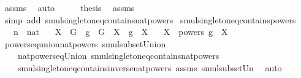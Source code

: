 \begin{isabellebody}
\ assms\ \isamarkupfalse%
\ auto\isanewline
\ \ \isamarkupfalse%
\ \isamarkupfalse%
\ {\isacharquery}{\kern0pt}thesis\ \isamarkupfalse%
\ assms\ \isamarkupfalse%
\ {\isacharparenleft}{\kern0pt}simp\ add{\isacharcolon}{\kern0pt}\ smul{\isacharunderscore}{\kern0pt}singleton{\isacharunderscore}{\kern0pt}eq{\isacharunderscore}{\kern0pt}contains{\isacharunderscore}{\kern0pt}nat{\isacharunderscore}{\kern0pt}powers{\isacharparenright}{\kern0pt}\isanewline
{}\isamarkupfalse%
%
\endisatagproof
{\isafoldproof}%
%
\isadelimproof
\isanewline
%
\endisadelimproof
\isanewline
{}\isamarkupfalse%
\ smul{\isacharunderscore}{\kern0pt}singleton{\isacharunderscore}{\kern0pt}eq{\isacharunderscore}{\kern0pt}contains{\isacharunderscore}{\kern0pt}powers{\isacharcolon}{\kern0pt}\isanewline
\ \ \ n\ {\isacharcolon}{\kern0pt}{\isacharcolon}{\kern0pt}\ nat\isanewline
\ \ \ {\isachardoublequoteopen}X\ {\isasymsubseteq}\ G{\isachardoublequoteclose}\ \ {\isachardoublequoteopen}g\ {\isasymin}\ G{\isachardoublequoteclose}\ \ {\isachardoublequoteopen}X\ {\isasymcdots}\ {\isacharbraceleft}{\kern0pt}g{\isacharbraceright}{\kern0pt}\ {\isacharequal}{\kern0pt}\ X{\isachardoublequoteclose}\isanewline
\ \ \ {\isachardoublequoteopen}X\ {\isasymcdots}\ {\isacharparenleft}{\kern0pt}powers\ g{\isacharparenright}{\kern0pt}\ {\isacharequal}{\kern0pt}\ X{\isachardoublequoteclose}%
\isadelimproof
\ %
\endisadelimproof
%
\isatagproof
{}\isamarkupfalse%
\ powers{\isacharunderscore}{\kern0pt}eq{\isacharunderscore}{\kern0pt}union{\isacharunderscore}{\kern0pt}nat{\isacharunderscore}{\kern0pt}powers\ smul{\isacharunderscore}{\kern0pt}subset{\isacharunderscore}{\kern0pt}Union{}\ \isanewline
\ \ \ \ nat{\isacharunderscore}{\kern0pt}powers{\isacharunderscore}{\kern0pt}eq{\isacharunderscore}{\kern0pt}Union\ smul{\isacharunderscore}{\kern0pt}singleton{\isacharunderscore}{\kern0pt}eq{\isacharunderscore}{\kern0pt}contains{\isacharunderscore}{\kern0pt}nat{\isacharunderscore}{\kern0pt}powers\ \isanewline
\ \ \ \ smul{\isacharunderscore}{\kern0pt}singleton{\isacharunderscore}{\kern0pt}eq{\isacharunderscore}{\kern0pt}contains{\isacharunderscore}{\kern0pt}inverse{\isacharunderscore}{\kern0pt}nat{\isacharunderscore}{\kern0pt}powers\ assms\ smul{\isacharunderscore}{\kern0pt}subset{\isacharunderscore}{\kern0pt}Un{}\ \isamarkupfalse%
\ auto%
\endisatagproof
{\isafoldproof}%
%
\isadelimproof
%
\endisadelimproof
\isanewline
\isanewline
{}\isamarkupfalse%
\isanewline
%
\isadelimtheory
\isanewline
%
\endisadelimtheory
%
\isatagtheory
{}\isamarkupfalse%
%
\endisatagtheory
{\isafoldtheory}%
%
\isadelimtheory
%
\endisadelimtheory
%
\end{isabellebody}%
